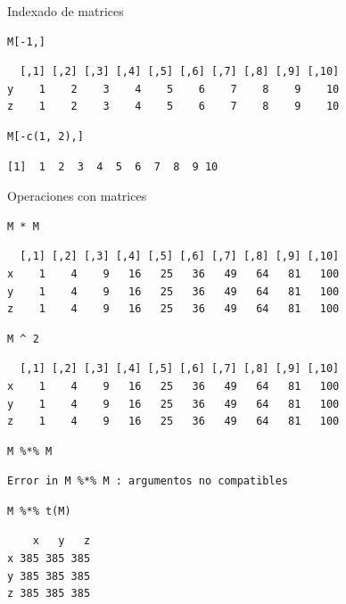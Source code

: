 \documentclass[xcolor={usenames,svgnames,dvipsnames}]{beamer}
\begin{document}
\begin{frame}[fragile,label=sec-2-2-6]{Indexado de matrices}
 \lstset{language=R,label= ,caption= ,numbers=none}
\begin{lstlisting}
M[-1,]
\end{lstlisting}

\begin{verbatim}
  [,1] [,2] [,3] [,4] [,5] [,6] [,7] [,8] [,9] [,10]
y    1    2    3    4    5    6    7    8    9    10
z    1    2    3    4    5    6    7    8    9    10
\end{verbatim}

\lstset{language=R,label= ,caption= ,numbers=none}
\begin{lstlisting}
M[-c(1, 2),]
\end{lstlisting}

\begin{verbatim}
[1]  1  2  3  4  5  6  7  8  9 10
\end{verbatim}
\end{frame}

\begin{frame}[fragile,label=sec-2-2-7]{Operaciones con matrices}
 \lstset{language=R,label= ,caption= ,numbers=none}
\begin{lstlisting}
M * M
\end{lstlisting}

\begin{verbatim}
  [,1] [,2] [,3] [,4] [,5] [,6] [,7] [,8] [,9] [,10]
x    1    4    9   16   25   36   49   64   81   100
y    1    4    9   16   25   36   49   64   81   100
z    1    4    9   16   25   36   49   64   81   100
\end{verbatim}

\lstset{language=R,label= ,caption= ,numbers=none}
\begin{lstlisting}
M ^ 2
\end{lstlisting}

\begin{verbatim}
  [,1] [,2] [,3] [,4] [,5] [,6] [,7] [,8] [,9] [,10]
x    1    4    9   16   25   36   49   64   81   100
y    1    4    9   16   25   36   49   64   81   100
z    1    4    9   16   25   36   49   64   81   100
\end{verbatim}

\lstset{language=R,label= ,caption= ,numbers=none}
\begin{lstlisting}
M %*% M
\end{lstlisting}

\begin{verbatim}
Error in M %*% M : argumentos no compatibles
\end{verbatim}

\lstset{language=R,label= ,caption= ,numbers=none}
\begin{lstlisting}
M %*% t(M)
\end{lstlisting}

\begin{verbatim}
    x   y   z
x 385 385 385
y 385 385 385
z 385 385 385
\end{verbatim}
\end{frame}
\end{document}

